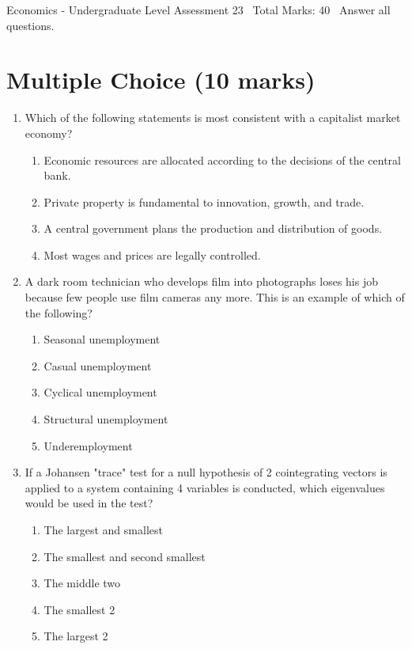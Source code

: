 \documentclass[12pt]{article}
\begin{document}
\begin{center}
Economics - Undergraduate Level Assessment 23 \
Total Marks: 40 \
Answer all questions.
\end{center}

\section*{Multiple Choice (10 marks)}
\begin{enumerate}[label=\arabic*.]
\item Which of the following statements is most consistent with a capitalist market economy?
\begin{enumerate}[label=(\alph*)]
    \item Economic resources are allocated according to the decisions of the central bank.
    \item Private property is fundamental to innovation, growth, and trade.
    \item A central government plans the production and distribution of goods.
    \item Most wages and prices are legally controlled.
\end{enumerate}
\item A dark room technician who develops film into photographs loses his job because few people use film cameras any more. This is an example of which of the following?
\begin{enumerate}[label=(\alph*)]
    \item Seasonal unemployment
    \item Casual unemployment
    \item Cyclical unemployment
    \item Structural unemployment
    \item Underemployment
\end{enumerate}
\item If a Johansen "trace" test for a null hypothesis of 2 cointegrating vectors is applied to a system containing 4 variables is conducted, which eigenvalues would be used in the test?
\begin{enumerate}[label=(\alph*)]
    \item The largest and smallest
    \item The smallest and second smallest
    \item The middle two
    \item The smallest 2
    \item The largest 2
\end{enumerate}

\end{enumerate}
\end{document}
